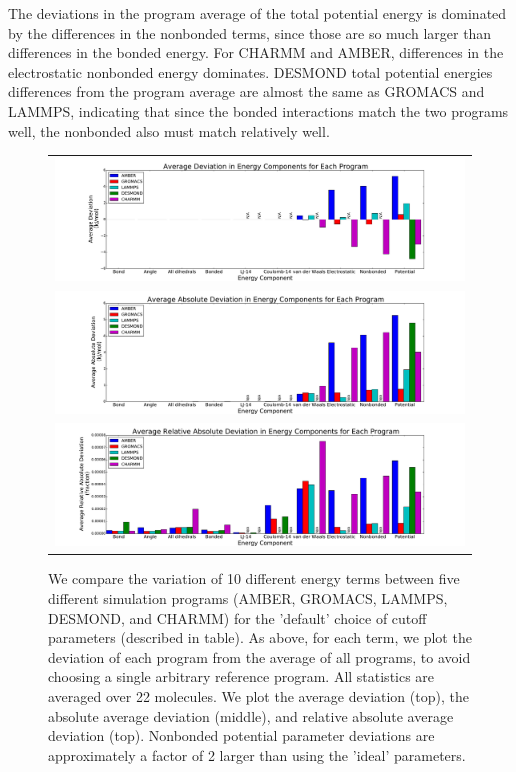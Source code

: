 The deviations in the program average of the total potential energy is
dominated by the differences in the nonbonded terms, since those are
so much larger than differences in the bonded energy.  For CHARMM and
AMBER, differences in the electrostatic nonbonded energy
dominates. DESMOND total potential energies differences from the
program average are almost the same as GROMACS and LAMMPS, indicating
that since the bonded interactions match the two programs well, the
nonbonded also must match relatively well.


\begin{figure}[h]
\begin{tabular}{c}
\includegraphics[width=\textwidth]{AverageDefaultSettings.pdf} \\  
\includegraphics[width=\textwidth]{AverageAbsoluteDefaultSettings.pdf} \\  
\includegraphics[width=\textwidth]{AverageRelativeAbsoluteDefaultSettings.pdf}
\end{tabular}
\caption{We compare the variation of 10 different energy terms between
  five different simulation programs (AMBER, GROMACS, LAMMPS, DESMOND,
  and CHARMM) for the 'default' choice of cutoff parameters (described
  in table). As above, for each term, we plot the deviation of each
  program from the average of all programs, to avoid choosing a single
  arbitrary reference program. All statistics are averaged over 22
  molecules. We plot the average deviation (top), the absolute average
  deviation (middle), and relative absolute average deviation
  (top). Nonbonded potential parameter deviations are approximately a
  factor of 2 larger than using the 'ideal' parameters.
\label{fig:defaultfig}}
\end{figure}

